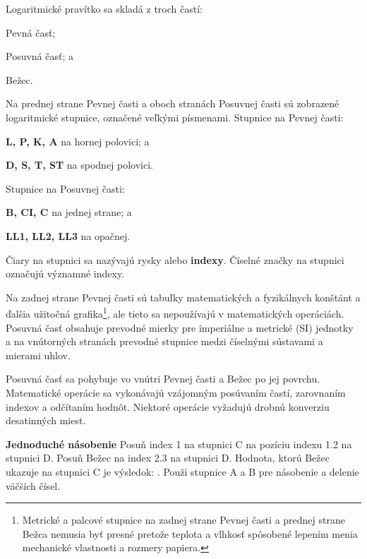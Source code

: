   \begin{multicols*}{3}
  \normalsize{
  Logaritmické pravítko sa skladá z troch častí:
    \begin{inparaenum}[a\upshape)]
      \item Pevná časť;
      \item Posuvná časť; a
      \item Bežec.
    \end{inparaenum}

  Na prednej strane Pevnej časti a oboch stranách Posuvnej časti sú zobrazené logaritmické stupnice, označené veľkými písmenami. Stupnice na Pevnej časti:
  \begin{inparaenum}[a\upshape)]
    \item \textbf{L, P, K, A} na hornej polovici; a
    \item \textbf{D, S, T, ST} na spodnej polovici.
  \end{inparaenum}
  Stupnice na Posuvnej časti:
  \begin{inparaenum}[a\upshape)]
    \item \textbf{B, CI, C} na jednej strane; a
    \item \textbf{LL1, LL2, LL3} na opačnej.
  \end{inparaenum}

  Čiary na stupnici sa nazývajú rysky alebo \textbf{indexy}. Číselné značky na stupnici označujú významné indexy.

  Na zadnej strane Pevnej časti sú tabuľky matematických a fyzikálnych konštánt a ďalšia užitočná grafika\footnote{Metrické a palcové stupnice na zadnej strane Pevnej časti a prednej strane Bežca nemusia byť presné pretože teplota a vlhkosť spôsobené lepením menia mechanické vlastnosti a rozmery papiera.}, ale tieto sa nepoužívajú v matematických operáciách. Posuvná časť obsahuje prevodné mierky pre imperiálne a metrické (SI) jednotky a na vnútorných stranách prevodné stupnice medzi číselnými sústavami a mierami uhlov.

  Posuvná časť sa pohybuje vo vnútri Pevnej časti a Bežec po jej povrchu. Matematické operácie sa vykonávajú vzájomným posúvaním častí, zarovnaním indexov a odčítaním hodnôt. Niektoré operácie vyžadujú drobnú konverziu desatinných miest.

  \textbf{Jednoduché násobenie}
Posuň index 1 na stupnici C na pozíciu indexu 1.2 na stupnici D.
Posuň Bežec na index 2.3 na stupnici D.
Hodnota, ktorú Bežec ukazuje na stupnici C je výsledok: .
\footnotesize Použi stupnice A a B pre násobenie a delenie väčších čísel.
\normalsize

}
\end{multicols*}
